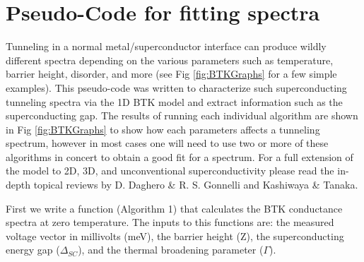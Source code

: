 \section{Pseudo-Code for fitting spectra}
Tunneling in a normal metal/superconductor interface can produce wildly different spectra depending on the various parameters such as temperature, barrier height, disorder, and more (see Fig \ref{fig:BTKGraphs} for a few simple examples). This pseudo-code was written to characterize such superconducting tunneling spectra via the 1D \ac{BTK} model and extract information such as the superconducting gap. The results of running each individual algorithm are shown in Fig \ref{fig:BTKGraphs} to show how each parameters affects a tunneling spectrum, however in most cases one will need to use two or more of these algorithms in concert to obtain a good fit for a spectrum. For a full extension of the model to 2D, 3D, and unconventional superconductivity please read the in-depth topical reviews by D. Daghero \& R. S. Gonnelli\cite{Daghero2010} and Kashiwaya \& Tanaka\cite{Kashiwaya2000}.\par
First we write a function (Algorithm 1) that calculates the \ac{BTK} conductance spectra at zero temperature. The inputs to this functions are: the measured voltage vector in millivolts (meV), the barrier height (Z), the superconducting energy gap ($\Delta_{SC}$), and the thermal broadening parameter ($\Gamma$).
